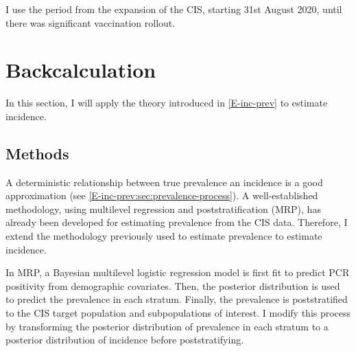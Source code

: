 \documentclass[thesis.tex]{subfiles}
\begin{document}
I use the period from the expansion of the CIS, starting 31st August 2020, until there was significant vaccination rollout.

\section{Backcalculation} \label{backcalc}

In this section, I will apply the theory introduced in \cref{E-inc-prev} to estimate incidence.


\subsection{Methods} \label{backcalc:sec:methods}

A deterministic relationship between true prevalence an incidence is a good approximation (see \cref{E-inc-prev:sec:prevalence-process}).
A well-established methodology, using multilevel regression and poststratification (MRP), has already been developed for estimating prevalence from the CIS data.
Therefore, I extend the methodology previously used to estimate prevalence to estimate incidence.

In MRP, a Bayesian multilevel logistic regression model is first fit to predict PCR positivity from demographic covariates.
Then, the posterior distribution is used to predict the prevalence in each stratum.
Finally, the prevalence is poststratified to the CIS target population and subpopulations of interest.
I modify this process by transforming the posterior distribution of prevalence in each stratum to a posterior distribution of incidence before poststratifying.
\end{document}

